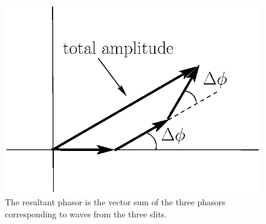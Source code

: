 \begin{figure}
\begin{center}
 \includegraphics[width=2.0truein]{phasors/phasor21} 
\caption{\label{fig:phasor21}The resultant phasor is the vector sum of the
three phasors corresponding to waves from the three slits.}
\end{center}
\end{figure}

